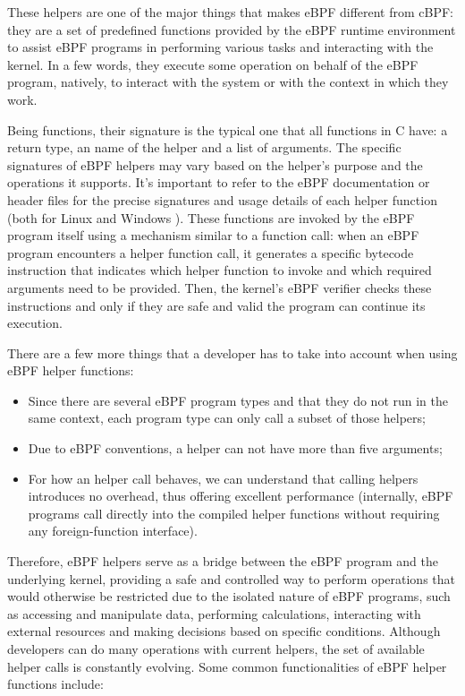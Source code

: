 These helpers are one of the major things that makes eBPF different from cBPF: they are a set of predefined functions provided by the eBPF runtime environment to assist eBPF programs in performing various tasks and interacting with the kernel.
In a few words, they execute some operation on behalf of the eBPF program, natively, to interact with the system or with the context in which they work. 

Being functions, their signature is the typical one that all functions in C have: a return type, an name of the helper and a list of arguments.
The specific signatures of eBPF helpers may vary based on the helper's purpose and the operations it supports. 
It's important to refer to the eBPF documentation or header files for the precise signatures and usage details of each helper function (both for Linux \cite{LinuxHelpers} and Windows \cite{WindowsHelpers}).
These functions are invoked by the eBPF program itself using a mechanism similar to a function call: when an eBPF program encounters a helper function call, it generates a specific bytecode instruction that indicates which helper function to invoke and which required arguments need to be provided.
Then, the kernel's eBPF verifier checks these instructions and only if they are safe and valid the program can continue its execution.

There are a few more things that a developer has to take into account when using eBPF helper functions:

\begin{itemize}
	\item Since there are several eBPF program types and that they do not run in the
		same context, each program type can only call a subset of those helpers;
	\item Due to eBPF conventions, a helper can not have more than five arguments;
	\item For how an helper call behaves, we can understand that calling helpers
		introduces no overhead, thus offering excellent performance (internally, eBPF programs call directly into the compiled helper functions without requiring any foreign-function interface).
\end{itemize}

Therefore, eBPF helpers serve as a bridge between the eBPF program and the underlying kernel, providing a safe and controlled way to perform operations that would otherwise be restricted due to the isolated nature of eBPF programs, such as accessing and manipulate data, performing calculations, interacting with external resources and making decisions based on specific conditions.
Although developers can do many operations with current helpers, the set of available helper calls is constantly evolving.
Some common functionalities of eBPF helper functions include:

